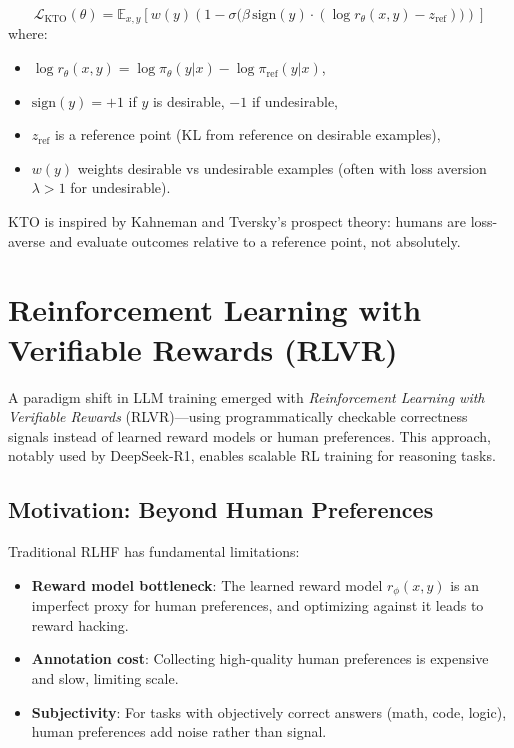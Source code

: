 \begin{definition}
    \[
        \mathcal{L}_{\text{KTO}}(\theta) = \mathbb{E}_{x, y} \left[ w(y) \left( 1 - \sigma\bigl( \beta \, \text{sign}(y) \cdot (\log r_\theta(x,y) - z_{\text{ref}}) \bigr) \right) \right]
    \]
    where:
    \begin{itemize}
        \item $\log r_\theta(x,y) = \log \pi_\theta(y|x) - \log \pi_{\text{ref}}(y|x)$,
        \item $\text{sign}(y) = +1$ if $y$ is desirable, $-1$ if undesirable,
        \item $z_{\text{ref}}$ is a reference point (KL from reference on desirable examples),
        \item $w(y)$ weights desirable vs undesirable examples (often with loss aversion $\lambda > 1$ for undesirable).
    \end{itemize}
\end{definition}

\begin{remark}
    KTO is inspired by Kahneman and Tversky's prospect theory: humans are loss-averse and evaluate outcomes relative to a reference point, not absolutely.
\end{remark}

\section{Reinforcement Learning with Verifiable Rewards (RLVR)}
\label{sec:rlvr}

A paradigm shift in LLM training emerged with \emph{Reinforcement Learning with Verifiable Rewards} (RLVR)---using programmatically checkable correctness signals instead of learned reward models or human preferences. This approach, notably used by DeepSeek-R1, enables scalable RL training for reasoning tasks.

\subsection{Motivation: Beyond Human Preferences}

Traditional RLHF has fundamental limitations:
\begin{itemize}
    \item \textbf{Reward model bottleneck}: The learned reward model $r_\phi(x, y)$ is an imperfect proxy for human preferences, and optimizing against it leads to reward hacking.
    \item \textbf{Annotation cost}: Collecting high-quality human preferences is expensive and slow, limiting scale.
    \item \textbf{Subjectivity}: For tasks with objectively correct answers (math, code, logic), human preferences add noise rather than signal.
\end{itemize}

